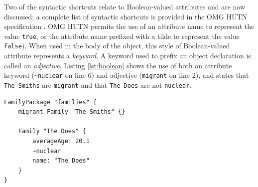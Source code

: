 Two of the syntactic shortcuts relate to Boolean-valued attributes and are now discussed; a complete list of syntactic shortcuts is provided in the OMG HUTN specification \cite{hutn}. OMG HUTN permits the use of an attribute name to represent the value \texttt{true}, or the attribute name prefixed with a tilde to represent the value \texttt{false}). When used in the body of the object, this style of Boolean-valued attribute represents a \emph{keyword}. A keyword used to prefix an object declaration is called an \emph{adjective}. Listing \ref{lst:boolean} shows the use of both an attribute keyword (\texttt{\textasciitilde nuclear} on line 6) and adjective (\texttt{migrant} on line 2), and states that \texttt{The Sm\-it\-hs} are \texttt{mi\-gr\-a\-nt} and that \texttt{The Do\-es} are not \texttt{nu\-cl\-e\-ar}.

\begin{lstlisting}[caption={[Keywords and adjectives in HUTN]Keywords and adjectives in HUTN, taken from \cite{rose08hutn}}, label=lst:boolean, language=HutnFamilies]
FamilyPackage "families" {
    migrant Family "The Smiths" {}

    Family "The Does" {
        averageAge: 20.1
        ~nuclear
        name: "The Does"
    }
}
\end{lstlisting}


